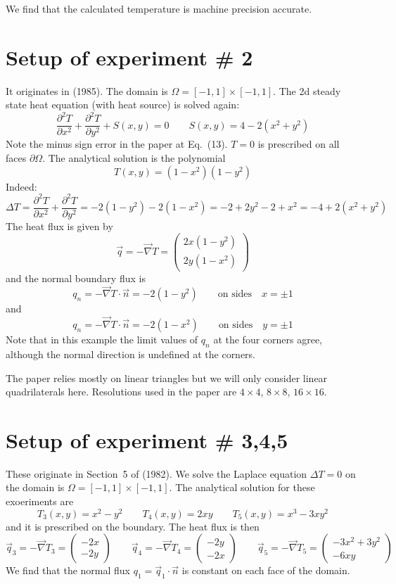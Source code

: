 We find that the calculated temperature is machine precision accurate.

\section*{Setup of experiment \# 2}

It originates in \textcite{cacs85} (1985). The domain is $\Omega=[-1,1]\times [-1,1]$.
The 2d steady state heat equation (with heat source) is solved again:
\[
\frac{\partial^2 T}{\partial x^2} + \frac{\partial^2 T}{\partial y^2} + S(x,y) = 0
\qquad
S(x,y)=4-2(x^2+y^2)
\]
Note the minus sign error in the paper at Eq.~(13).
$T=0$ is prescribed on all faces $\partial \Omega$.
The analytical solution is the polynomial
\[
T(x,y)=(1-x^2)(1-y^2)
\]
Indeed:
\[
\Delta T = \frac{\partial^2 T}{\partial x^2} + \frac{\partial^2 T}{\partial y^2}
= -2(1-y^2) -2(1-x^2)
= -2 + 2y^2 -2 + x^2
= -4 + 2(x^2+y^2)
\]
The heat flux is given by 
\[
\vec{q} = -\vec\nabla T = 
\left(
\begin{array}{c}
2x(1-y^2) \\
2y(1-x^2)
\end{array}
\right)
\]
and the normal boundary flux is 
\[
{q}_n=-\vec\nabla T \cdot \vec{n}=-2(1-y^2) \qquad \text{on sides} \quad x=\pm 1
\]
and
\[
{q}_n=-\vec\nabla T \cdot \vec{n}=-2(1-x^2) \qquad \text{on sides} \quad y=\pm 1
\]
Note that in this example the limit values of $q_n$ at the four corners agree, 
although the normal direction is undefined at the corners.

The paper relies mostly on linear triangles but we will only consider 
linear quadrilaterals here.
Resolutions used in the paper are $4\times 4$, $8\times 8$, $16\times 16$.

\section*{Setup of experiment \# 3,4,5}

These originate in Section~5 of \textcite{care82} (1982).
We solve the Laplace equation $\Delta T=0$ on the domain is $\Omega=[-1,1]\times [-1,1]$.
The analytical solution for these exoeriments are 
\[
T_3(x,y)=x^2-y^2
\qquad
T_4(x,y)=2xy
\qquad
T_5(x,y)=x^3-3xy^2
\]
and it is prescribed on the boundary. The heat flux is then
\[
\vec{q}_3 
= -\vec\nabla T_3
= \left(\begin{array}{c}
-2x \\ -2y
\end{array}\right)
\qquad
\vec{q}_4
= -\vec\nabla T_4
= \left(\begin{array}{c}
-2y \\ -2x
\end{array}\right)
\qquad
\vec{q}_5
= -\vec\nabla T_5
= \left(\begin{array}{c}
-3x^2+3y^2 \\ -6xy
\end{array}\right)
\]
We find that the normal flux $q_1=\vec{q}_1\cdot\vec{n}$ is constant on each face 
of the domain.


